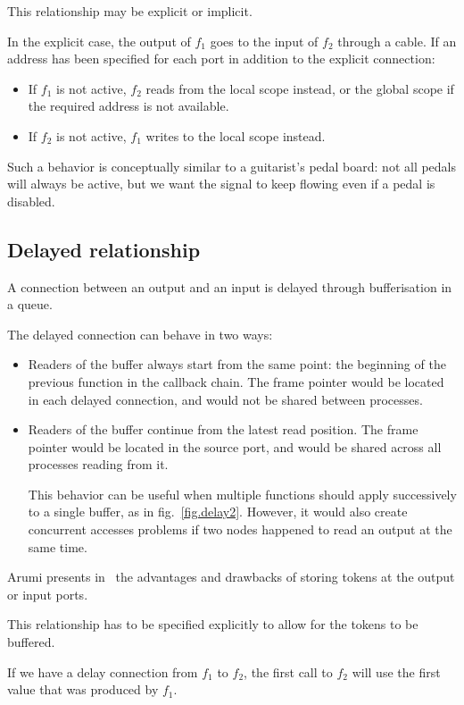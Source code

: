 \documentclass{article}
\begin{document}
This relationship may be explicit or implicit.

In the explicit case, the output of $f_1$ goes to the input of $f_2$ through a cable. 
If an address has been specified for each port in addition to the explicit connection:
\begin{itemize}
	\item If $f_1$ is not active, $f_2$ reads from the local scope instead, or the global scope if the required address is not available.
	\item If $f_2$ is not active, $f_1$ writes to the local scope instead.
\end{itemize}

Such a behavior is conceptually similar to a guitarist's pedal board: not all pedals will always be active, but we want the signal to keep flowing even if a pedal is disabled.

\subsection{Delayed relationship}
A connection between an output and an input is delayed through bufferisation in a queue.
	
The delayed connection can behave in two ways:
\begin{itemize}
  \item Readers of the buffer always start from the same point: the beginning of the previous function in the callback chain. 
  The frame pointer would be located in each delayed connection, and would not be shared between processes.
  \item Readers of the buffer continue from the latest read position. 
  The frame pointer would be located in the source port, and would be shared across all processes reading from it.

  This behavior can be useful when multiple functions should apply successively to a single buffer, as in fig.~\ref{fig.delay2}.
  However, it would also create concurrent accesses problems if two nodes happened to read an output at the same time.
  
  
\end{itemize}

Arumi presents in~\cite{arumi2006dataflow} the advantages and drawbacks of storing tokens at the output or input ports.

This relationship has to be specified explicitly to allow for the tokens to be buffered.
    
If we have a delay connection from $f_1$ to $f_2$, the first call to $f_2$ will use the first value that was produced by $f_1$.
\end{document}
